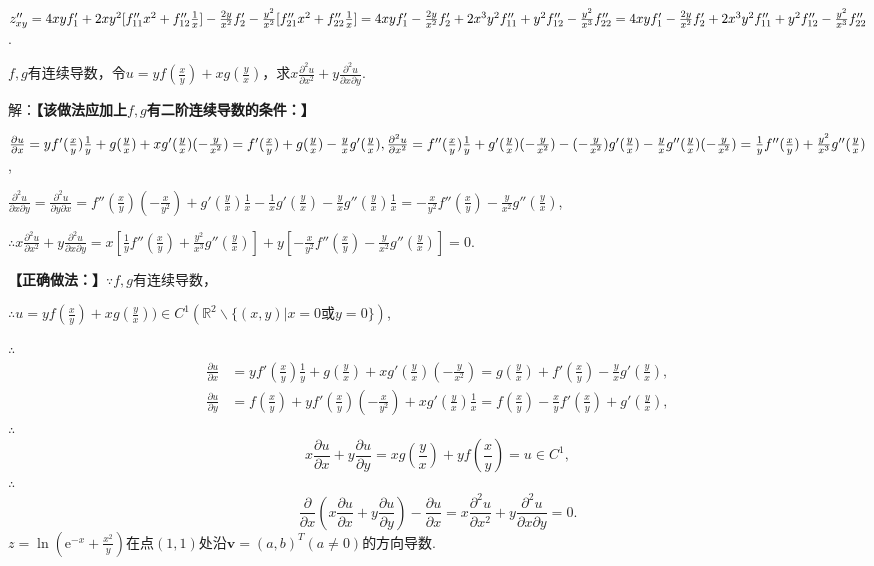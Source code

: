 \documentclass[12pt,UTF8]{ctexart}
\begin{document}
\begin{enumerate}
$z''_{xy}=4xyf'_1+2xy^2[f''_{11}x^2+f''_{12}\frac1x]-\frac{2y}{x^2}f'_2-\frac{y^2}{x^2}[f''_{21}x^2+f''_{22}\frac1x]\\
=4xyf'_1-\frac{2y}{x^2}f'_2+2x^3y^2f''_{11}+y^2f''_{12}-\frac{y^2}{x^3}f''_{22}\\
=4xyf'_1-\frac{2y}{x^2}f'_2+2x^3y^2f''_{11}+y^2f''_{12}-\frac{y^2}{x^3}f''_{22}$.

$f,g$有连续导数，令$u=yf(\frac xy)+xg(\frac yx)$，求$x\frac{\partial^2u}{\partial x^2}+y\frac{\partial^2u}{\partial x\partial y}$.

解：{\bf【该做法应加上$f,g$有二阶连续导数的条件：】}

$\frac{\partial u}{\partial x}=yf'(\frac xy)\frac1y+g(\frac yx)+xg'(\frac yx)(-\frac y{x^2})=f'(\frac xy)+g(\frac yx)-\frac yxg'(\frac yx),\\
\frac{\partial^2u}{\partial x^2}=f''(\frac xy)\frac1y+g'(\frac yx)(-\frac y{x^2})-(-\frac y{x^2})g'(\frac yx)-\frac yxg''(\frac yx)(-\frac y{x^2})=\frac1yf''(\frac xy)+\frac{y^2}{x^3}g''(\frac yx)$,

$\frac{\partial^2u}{\partial x\partial y}=\frac{\partial^2u}{\partial y\partial x}=f''(\frac xy)(-\frac x{y^2})+g'(\frac yx)\frac1x-\frac1xg'(\frac yx)-\frac yxg''(\frac yx)\frac1x=-\frac x{y^2}f''(\frac xy)-\frac y{x^2}g''(\frac yx)$,

$\therefore x\frac{\partial^2u}{\partial x^2}+y\frac{\partial^2u}{\partial x\partial y}=x[\frac1yf''(\frac xy)+\frac{y^2}{x^3}g''(\frac yx)]+y[-\frac x{y^2}f''(\frac xy)-\frac y{x^2}g''(\frac yx)]=0$.

{\bf【正确做法：】}$\because f,g$有连续导数，

$\therefore u=yf(\frac xy)+xg(\frac yx))\in C^1(\mathbb R^2\backslash\{(x,y)|x=0\text{或}y=0\})$,

$\therefore$
\[\begin{split}
\frac{\partial u}{\partial x}&=yf'(\frac xy)\frac1y+g(\frac yx)+xg'(\frac yx)(-\frac y{x^2})=g(\frac yx)+f'(\frac xy)-\frac yxg'(\frac yx),\\
\frac{\partial u}{\partial y}&=f(\frac xy)+yf'(\frac xy)(-\frac x{y^2})+xg'(\frac yx)\frac1x=f(\frac xy)-\frac xyf'(\frac xy)+g'(\frac yx),
\end{split}\]
$\therefore$
\[
x\frac{\partial u}{\partial x}+y\frac{\partial u}{\partial y}=xg(\frac yx)+yf(\frac xy)=u\in C^1,
\]
$\therefore$
\[
\frac{\partial}{\partial x}(x\frac{\partial u}{\partial x}+y\frac{\partial u}{\partial y})-\frac{\partial u}{\partial x}=x\frac{\partial^2u}{\partial x^2}+y\frac{\partial^2u}{\partial x\partial y}=0.
\]
$z=\ln(\mathrm e^{-x}+\frac{x^2}y)$在点$(1,1)$处沿$\bm v=(a,b)^T(a\neq0)$的方向导数.


\end{enumerate}
\end{document}
